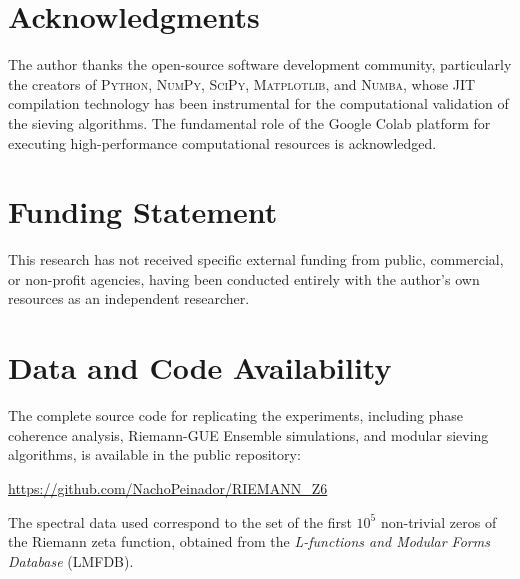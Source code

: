 \documentclass[12pt, a4paper]{article}
\theoremstyle{plain}
\theoremstyle{definition}
\theoremstyle{remark}
\begin{document}
\section*{Acknowledgments}
The author thanks the open-source software development community, particularly the creators of \textsc{Python}, \textsc{NumPy}, \textsc{SciPy}, \textsc{Matplotlib}, and \textsc{Numba}, whose JIT compilation technology has been instrumental for the computational validation of the sieving algorithms. The fundamental role of the Google Colab platform for executing high-performance computational resources is acknowledged.

\section*{Funding Statement}
This research has not received specific external funding from public, commercial, or non-profit agencies, having been conducted entirely with the author's own resources as an independent researcher.

\section*{Data and Code Availability}
The complete source code for replicating the experiments, including phase coherence analysis, Riemann-GUE Ensemble simulations, and modular sieving algorithms, is available in the public repository:
\begin{center}
\url{https://github.com/NachoPeinador/RIEMANN_Z6}
\end{center}
The spectral data used correspond to the set of the first $10^5$ non-trivial zeros of the Riemann zeta function, obtained from the \textit{L-functions and Modular Forms Database} (LMFDB).
\end{document}

